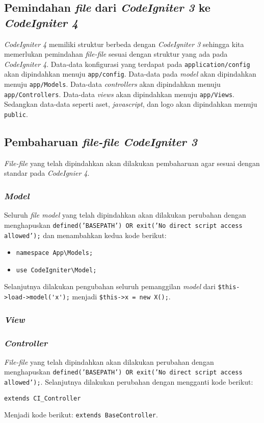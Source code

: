 \begin{center}
	\verb||
\end{center}

\subsection{Pemindahan \textit{file} dari \textit{CodeIgniter 3} ke \textit{CodeIgniter 4}}
\textit{CodeIgniter 4} memiliki struktur berbeda dengan \textit{CodeIgniter 3} sehingga kita memerlukan pemindahan \textit{file-file} sesuai dengan struktur yang ada pada \textit{CodeIgniter 4}. Data-data konfigurasi yang terdapat pada \texttt{application/config} akan dipindahkan menuju \texttt{app/config}. Data-data pada \textit{model} akan dipindahkan menuju \verb|app/Models|. Data-data \textit{controllers} akan dipindahkan menuju \verb|app/Controllers|. Data-data \textit{views} akan dipindahkan menuju \verb|app/Views|. Sedangkan data-data seperti aset, \textit{javascript}, dan logo akan dipindahkan menuju \verb|public|.

\subsection{Pembaharuan \textit{file-file CodeIgniter 3}}
\textit{File-file} yang telah dipindahkan akan dilakukan pembaharuan agar sesuai dengan standar pada \textit{CodeIgnier 4}. 
\subsubsection{\textit{Model}}
Seluruh \textit{file model} yang telah dipindahkan akan dilakukan perubahan dengan menghapuskan \texttt{defined('BASEPATH') OR exit('No direct script access allowed');} dan menambahkan kedua kode berikut:
\begin{itemize}
	\item \verb|namespace App\Models;|
	\item \verb|use CodeIgniter\Model;|
\end{itemize}

Selanjutnya dilakukan pengubahan seluruh pemanggilan \textit{model} dari \verb|$this->load->model('x');| menjadi \verb|$this->x = new X();|.

\subsubsection{\textit{View}}
\subsubsection{\textit{Controller}}
\textit{File-file} yang telah dipindahkan akan dilakukan perubahan dengan menghapuskan \texttt{defined('BASEPATH') OR exit('No direct script access allowed');}. Selanjutnya dilakukan perubahan dengan mengganti kode berikut:
\begin{center}
	\verb|extends CI_Controller|
\end{center}
\begin{center}
Menjadi kode berikut:
	\verb|extends BaseController|.
\end{center}

